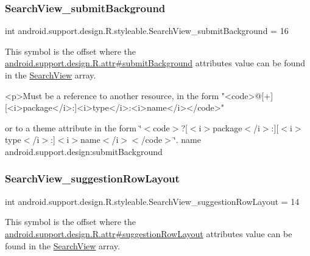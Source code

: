 \subsubsection{\texorpdfstring{Search\+View\+\_\+submit\+Background}{SearchView\_submitBackground}}
{\footnotesize\ttfamily int android.\+support.\+design.\+R.\+styleable.\+Search\+View\+\_\+submit\+Background = 16\hspace{0.3cm}{\ttfamily [static]}}

This symbol is the offset where the \hyperlink{classandroid_1_1support_1_1design_1_1R_1_1attr_aed7a9a95b5ca3a84d2d0d0b5d7cba82b}{android.\+support.\+design.\+R.\+attr\#submit\+Background} attribute\textquotesingle{}s value can be found in the \hyperlink{classandroid_1_1support_1_1design_1_1R_1_1styleable_a8f7e72dc1bf854e14c1be7dbc1cb7392}{Search\+View} array.

\begin{DoxyVerb}      <p>Must be a reference to another resource, in the form "<code>@[+][<i>package</i>:]<i>type</i>:<i>name</i></code>"
\end{DoxyVerb}
 or to a theme attribute in the form \char`\"{}$<$code$>$?\mbox{[}$<$i$>$package$<$/i$>$\+:\mbox{]}\mbox{[}$<$i$>$type$<$/i$>$\+:\mbox{]}$<$i$>$name$<$/i$>$$<$/code$>$\char`\"{}.  name android.\+support.\+design\+:submit\+Background \mbox{\label{classandroid_1_1support_1_1design_1_1R_1_1styleable_aa9bcaf27bf978930d50357c99f8abada}} 
\subsubsection{\texorpdfstring{Search\+View\+\_\+suggestion\+Row\+Layout}{SearchView\_suggestionRowLayout}}
{\footnotesize\ttfamily int android.\+support.\+design.\+R.\+styleable.\+Search\+View\+\_\+suggestion\+Row\+Layout = 14\hspace{0.3cm}{\ttfamily [static]}}

This symbol is the offset where the \hyperlink{classandroid_1_1support_1_1design_1_1R_1_1attr_ad909aebf0409cf0d4e1a58e44ddf7248}{android.\+support.\+design.\+R.\+attr\#suggestion\+Row\+Layout} attribute\textquotesingle{}s value can be found in the \hyperlink{classandroid_1_1support_1_1design_1_1R_1_1styleable_a8f7e72dc1bf854e14c1be7dbc1cb7392}{Search\+View} array.

